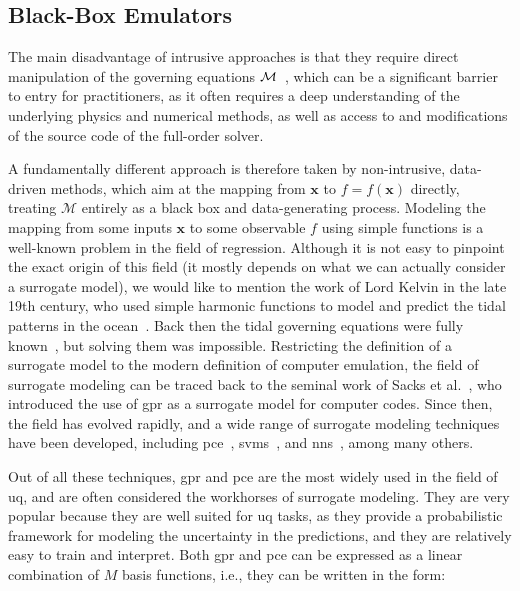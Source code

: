 \smallskip
\subsection{Black-Box Emulators}
The main disadvantage of intrusive approaches is that they require direct manipulation of the governing equations $\mathcal{M}$~\cite{Padula2024}, which can be a significant barrier to entry for practitioners, as it often requires a deep understanding of the underlying physics and numerical methods, as well as access to and modifications of the source code of the full-order solver. 

\smallskip
A fundamentally different approach is therefore taken by non-intrusive, data-driven methods, which aim at  the mapping from $\mathbf{x}$ to $f=f(\mathbf{x})$ directly, treating $\mathcal{M}$ entirely as a black box and data-generating process. Modeling the mapping from some inputs $\mathbf{x}$ to some observable $f$ using simple functions is a well-known problem in the field of regression. Although it is not easy to pinpoint the exact origin of this field (it mostly depends on what we can actually consider a surrogate model), we would like to mention the work of Lord Kelvin in the late 19th century, who used simple harmonic functions to model and predict the tidal patterns in the ocean~\cite{Tides}. Back then the tidal governing equations were fully known~\cite{pekeris1969}, but solving them was impossible. Restricting the definition of a surrogate model to the modern definition of computer emulation, the field of surrogate modeling can be traced back to the seminal work of Sacks et al.~\cite{sacks1989design}, who introduced the use of \gls{gpr} as a surrogate model for computer codes. Since then, the field has evolved rapidly, and a wide range of surrogate modeling techniques have been developed, including \gls{pce}~\cite{xiu2002wiener,Sudret2008}, \glspl{svm}~\cite{clarke2005analysis}, and \glspl{nn}~\cite{ghaboussi1991knowledge, Cuomo2022}, among many others.

\smallskip
Out of all these techniques, \gls{gpr} and \gls{pce} are the most widely used in the field of \gls{uq}, and are often considered the workhorses of surrogate modeling. They are very popular because they are well suited for \gls{uq} tasks, as they provide a probabilistic framework for modeling the uncertainty in the predictions, and they are relatively easy to train and interpret. Both \gls{gpr} and \gls{pce} can be expressed as a linear combination of $M$ basis functions, i.e., they can be written in the form:

